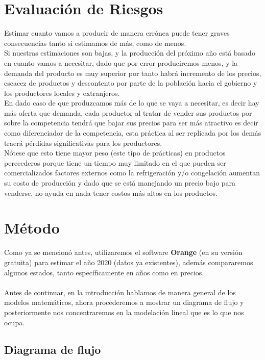 \documentclass{article}
\begin{document}
\section*{\Huge Evaluación de Riesgos}
Estimar cuanto vamos a producir de manera errónea puede tener graves consecuencias tanto si estimamos de más, como de menos.\\
Si nuestras estimaciones son bajas, y la producción del próximo año está basado en cuanto vamos a necesitar, dado que por error produciremos menos, y la demanda del producto es muy superior por tanto habrá incremento de los precios, escacez de productos y descontento por parte de la población hacia el gobierno y los productores locales y extranjeros. \\
En dado caso de que produzcamos más de lo que se vaya a necesitar, es decir hay más oferta que demanda, cada productor al tratar de vender sus productos por sobre la competencia tendrá que bajar sus precios para ser más atractivo es decir como diferenciador de la competencia, esta práctica al ser replicada por los demás traerá pérdidas significativas para los productores.\\
Nótese que esto tiene mayor peso (este tipo de prácticas) en productos perecederos porque tiene un tiempo muy limitado en el que pueden ser comercializados factores externos como la refrigeración y/o congelación aumentan su costo de producción y dado que se está manejando un precio bajo para venderse, no ayuda en nada tener costos más altos en los productos. 




\newpage

\section*{Método}
Como ya se mencionó antes, utilizaremos el software {\bfseries Orange} (en su versión gratuita) para estimar el año 2020 (datos ya existentes), además compararemos algunos estados, tanto específicamente en años como en precios.\\ \\
Antes de continuar, en la introducción hablamos de manera general de los modelos matemáticos, ahora procederemos a mostrar un diagrama de flujo y posteriormente nos concentraremos en la modelación lineal que es lo que nos ocupa. \\
\subsection*{Diagrama de flujo}
\end{document}
